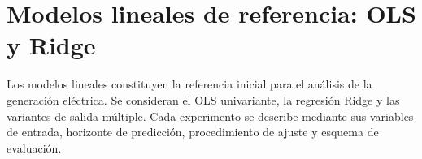 \section{Modelos lineales de referencia: OLS y Ridge}
\label{sec:metodo-lineales}

Los modelos lineales constituyen la referencia inicial para el análisis de la generación eléctrica. Se consideran el OLS univariante, la regresión Ridge y las variantes de salida múltiple. Cada experimento se describe mediante sus variables de entrada, horizonte de predicción, procedimiento de ajuste y esquema de evaluación.







